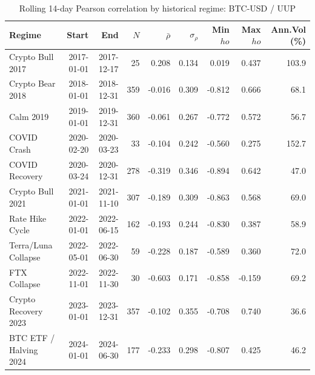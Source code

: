 \begin{table}[H]
\centering
\small
\caption{Rolling 14-day Pearson correlation by historical regime: BTC-USD / UUP}
\label{tab:regime_corr_BTCUSDUUP}
\begin{tabular}{lrrrrrrrr}
\toprule
Regime & Start & End & $N$ & $\bar{\rho}$ & $\sigma_\rho$ & Min $
ho$ & Max $
ho$ & Ann.Vol (\%) \\
\midrule
Crypto Bull 2017 & 2017-01-01 & 2017-12-17 & 25 & 0.208 & 0.134 & 0.019 & 0.437 & 103.9 \\
Crypto Bear 2018 & 2018-01-01 & 2018-12-31 & 359 & -0.016 & 0.309 & -0.812 & 0.666 & 68.1 \\
Calm 2019 & 2019-01-01 & 2019-12-31 & 360 & -0.061 & 0.267 & -0.772 & 0.572 & 56.7 \\
COVID Crash & 2020-02-20 & 2020-03-23 & 33 & -0.104 & 0.242 & -0.560 & 0.275 & 152.7 \\
COVID Recovery & 2020-03-24 & 2020-12-31 & 278 & -0.319 & 0.346 & -0.894 & 0.642 & 47.0 \\
Crypto Bull 2021 & 2021-01-01 & 2021-11-10 & 307 & -0.189 & 0.309 & -0.863 & 0.568 & 69.0 \\
Rate Hike Cycle & 2022-01-01 & 2022-06-15 & 162 & -0.193 & 0.244 & -0.830 & 0.387 & 58.9 \\
Terra/Luna Collapse & 2022-05-01 & 2022-06-30 & 59 & -0.228 & 0.187 & -0.589 & 0.360 & 72.0 \\
FTX Collapse & 2022-11-01 & 2022-11-30 & 30 & -0.603 & 0.171 & -0.858 & -0.159 & 69.2 \\
Crypto Recovery 2023 & 2023-01-01 & 2023-12-31 & 357 & -0.102 & 0.355 & -0.708 & 0.740 & 36.6 \\
BTC ETF / Halving 2024 & 2024-01-01 & 2024-06-30 & 177 & -0.233 & 0.298 & -0.807 & 0.425 & 46.2 \\
\bottomrule
\end{tabular}
\end{table}